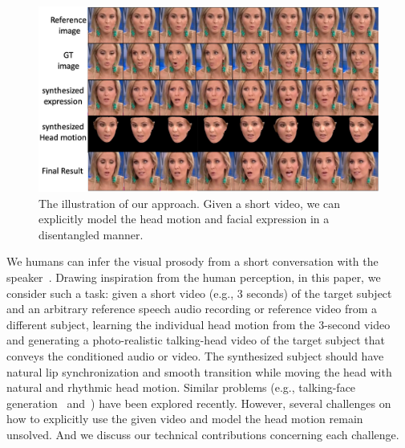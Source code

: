 \documentclass[runningheads]{llncs}
\begin{document}
\begin{figure}[t]
\includegraphics[width= \linewidth]{latex/images/teaser.pdf}
\caption{The illustration of our approach. Given a short video, we can explicitly model the head motion and facial expression in a disentangled manner.}
\label{fig:teaser}
\end{figure}


We humans can infer the visual prosody from a short conversation with the speaker~\cite{munhall2004visual}. Drawing inspiration from the human perception, in this paper, we consider such a task: given a short video (e.g., 3 seconds) of the target subject and an arbitrary reference speech audio recording or reference video from a different subject, learning the individual head motion from the 3-second video and generating a photo-realistic talking-head video of the target subject that conveys the conditioned audio or video. The synthesized subject should have natural lip synchronization and smooth transition while moving the head with natural and rhythmic head motion. Similar problems (e.g., talking-face generation~\cite{chung2017you,zhou2019talking,ijcai2019-129,vougioukas2019realistic,chen2019hierarchical} and~\cite{wiles2018x2face,zakharov2019few,wang2018fewshotvid2vid}) have been explored recently. However, several challenges on how to explicitly use the given video and model the head motion remain unsolved. And we discuss our technical contributions concerning each challenge. 

\end{document}
